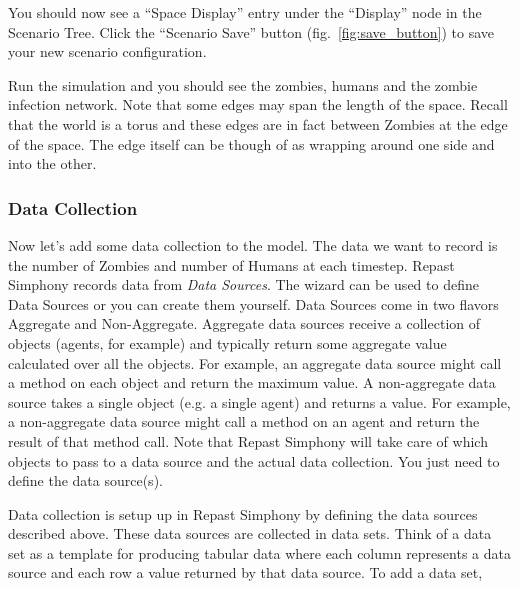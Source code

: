 \documentclass[11pt]{amsart}
\begin{document}
You should now see a ``Space Display'' entry under the ``Display'' node in the Scenario Tree. Click the ``Scenario Save''  button (fig.~\ref{fig:save_button}) to save your new scenario configuration.

Run the simulation and you should see the zombies, humans and the zombie infection network. Note that some edges may span the length of the space. Recall that the world is a torus and these edges are in fact between Zombies at the edge of the space. The edge itself can be though of as wrapping  around one side and into the other.

\subsubsection{Data Collection}
Now let's add some data collection to the model. The data we want to record is the number of Zombies and number of Humans at each timestep. Repast Simphony records data from \textit{Data Sources}. The wizard can be used to define Data Sources or you can create them yourself. Data Sources come in two flavors Aggregate and Non-Aggregate. Aggregate data sources receive a collection of objects (agents, for example) and typically return some aggregate value calculated over all the objects. For example, an aggregate data source might call a method on each object and return the maximum value. A non-aggregate data source takes a single object (e.g. a single agent) and returns a value. For example, a non-aggregate data source might call a method on an agent and return the result of that method call. Note that Repast Simphony will take care of which objects to pass to a data source and the actual data collection. You just need to define the data source(s). 

Data collection is setup up in Repast Simphony by defining the data sources described above. These data sources are collected in data sets. Think of a data set as a template for producing tabular data where each column represents a data source and each row a value returned by that data source. To add a data set, 
\end{document}
